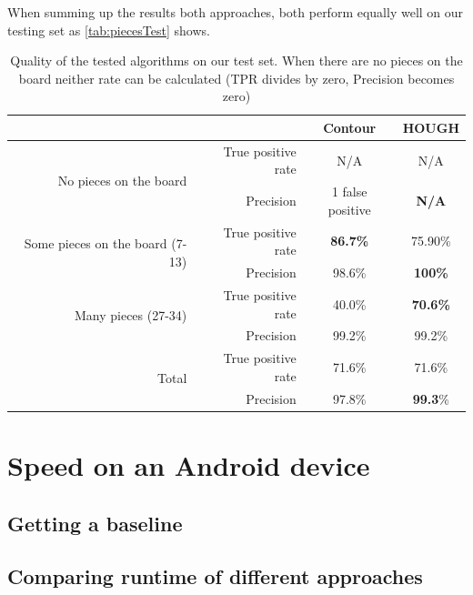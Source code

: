 	When summing up the results both approaches, both perform equally well on our testing set as \autoref{tab:piecesTest} shows.
	\begin{table}[bh]
		\begin{tabular}{|r|r||c|c|}
			\cline{3-4}
		    \multicolumn{2}{c|}{}											 		& Contour 	& HOUGH\\
			\cline{3-4}
			\hline
			\multirow{2}{*}{No pieces on the board}   		& True positive rate 	& N/A 		& N/A  \\
															& Precision			 	& 1 false positive 		& \bf{N/A} \\
			\hline
			\multirow{2}{*}{Some pieces on the board (7-13)}& True positive rate 	& \bf{86.7\%} 	& 75.90\% \\
															& Precision 			& 98.6\% 		& \bf{100\%} \\
			\hline
			\multirow{2}{*}{Many pieces (27-34)} 			& True positive rate 	& 40.0\% 		& \bf{70.6\%} \\
															& Precision			 	& 99.2\% 		& 99.2\% \\
			\hline
			\hline
			\multirow{2}{*}{Total}				 			& True positive rate 	& 71.6\% 		& 71.6\% \\
															& Precision			 	& 97.8\% 		& \textbf{99.3}\% \\
			\hline
		\end{tabular}
		\caption{Quality of the tested algorithms on our test set. When there are no pieces on the board neither rate can be calculated (TPR divides by zero, Precision becomes zero)}
		\label{tab:piecesTest}
	\end{table}





	\section{Speed on an Android device}
	\subsection{Getting a baseline}
	\subsection{Comparing runtime of different approaches}




